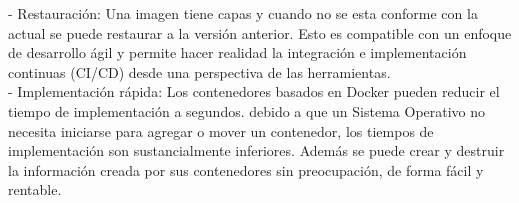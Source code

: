 \begin {itemize}
	\subitem - Restauración: Una imagen tiene capas y cuando no se esta conforme con la actual se puede restaurar a la versión anterior. Esto es compatible con un enfoque de desarrollo ágil y permite hacer realidad la integración e implementación continuas (CI/CD) desde una perspectiva de las herramientas.\\
	\subitem - Implementación rápida: Los contenedores basados en Docker pueden reducir el tiempo de implementación a segundos. debido a que un Sistema Operativo no necesita iniciarse para agregar o mover un contenedor, los tiempos de implementación son sustancialmente inferiores. 
Además se puede crear y destruir la información creada por sus contenedores sin preocupación, de forma fácil y rentable.\\
	
\end{itemize}






